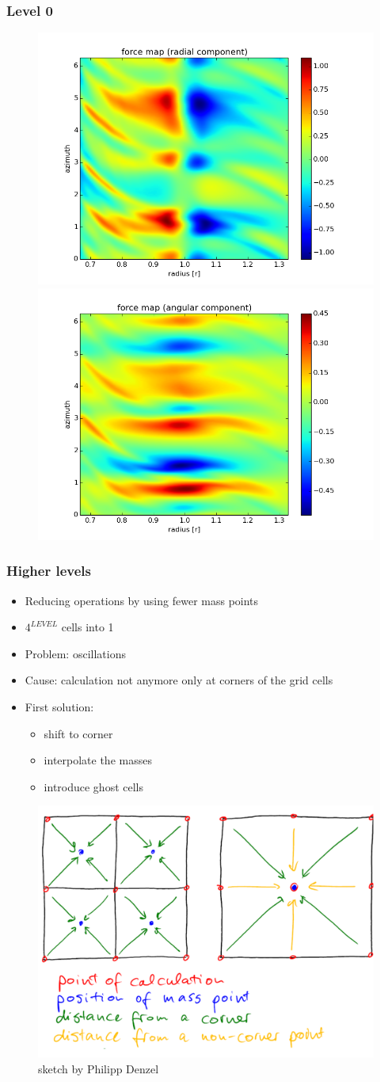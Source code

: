 \documentclass{beamer}
\begin{document}
\begin{frame}
 \frametitle{Level 0}
 \begin{figure}[H]
  \centering
  \includegraphics[width=.5\textwidth]{radial_force.png} \includegraphics[width=.5\textwidth]{angular_force.png}
 \end{figure} 
\end{frame}
\begin{frame}
 \frametitle{Higher levels}
 \begin{itemize}
  \item Reducing operations by using fewer mass points 
  \item $4^{LEVEL}$ cells into 1
  \item Problem: oscillations
  \item Cause: calculation not anymore only at corners of the grid cells
  \item First solution:
  \begin{itemize}
   \item shift to corner
   \item interpolate the masses
   \item introduce ghost cells
  \end{itemize}
 \end{itemize}
 \begin{figure}[H]
  \centering
  \includegraphics[width=.49\textwidth]{reimagined_sketch1.pdf}
  \caption{sketch by Philipp Denzel}
\end{figure}
\end{frame}
\end{document}
